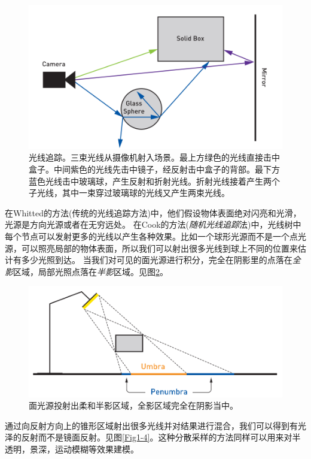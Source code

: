\documentclass[12pt]{article}
\begin{document}
\begin{figure}
	\centering
	\includegraphics[width=12.0cm]{Fig1-2.png}
	\caption{光线追踪。三束光线从摄像机射入场景。最上方绿色的光线直接击中盒子。中间紫色的光线先击中镜子，经反射击中盒子的背部。最下方蓝色光线击中玻璃球，产生反射和折射光线。折射光线接着产生两个子光线，其中一束穿过玻璃球的光线又产生两束光线。}
	\label{Fig1-2}
\end{figure}


在Whitted的方法(传统的光线追踪方法)中，他们假设物体表面绝对闪亮和光滑，光源是方向光源或者在无穷远处。 在Cook的方法(\textit{随机光线追踪}法)中，光线树中每个节点可以发射更多的光线以产生各种效果。比如一个球形光源而不是一个点光源，可以照亮局部的物体表面，所以我们可以射出很多光线到球上不同的位置来估计有多少光照到达。 当我们对可见的面光源进行积分，完全在阴影里的点落在\textit{全影}区域，局部光照点落在\textit{半影}区域。见图\ref{Fig1-3}。

\begin{figure}
	\centering
	\includegraphics[width=12.0cm]{Fig1-3.png}
	\caption{面光源投射出柔和半影区域，全影区域完全在阴影当中。}
	\label{Fig1-3}
\end{figure}


通过向反射方向上的锥形区域射出很多光线并对结果进行混合，我们可以得到有光泽的反射而不是镜面反射。见图\ref{Fig1-4}。这种分散采样的方法同样可以用来对半透明，景深，运动模糊等效果建模。
\end{document}
